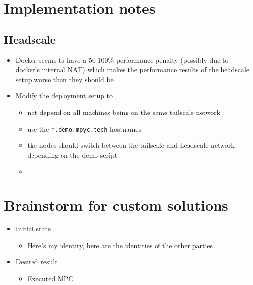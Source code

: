 \hypertarget{notes__03000-implementations.md}{}
\hypertarget{notes__03000-implementations.md__implementation-notes}{%
\chapter{Implementation
notes}\label{notes__03000-implementations.md__implementation-notes}}

\hypertarget{notes__03000-implementations.md__headscale}{%
\section{Headscale}\label{notes__03000-implementations.md__headscale}}

\begin{itemize}
\tightlist
\item
  Docker seems to have a 50-100\% performance penalty (possibly due to
  docker's internal NAT) which makes the performance results of the
  headscale setup worse than they should be
\item
  Modify the deployment setup to

  \begin{itemize}
  \tightlist
  \item
    not depend on all machines being on the same tailscale network
  \item
    use the \texttt{*.demo.mpyc.tech} hostnames
  \item
    the nodes should switch between the tailscale and headscale network
    depending on the demo script
  \item
  \end{itemize}
\end{itemize}

\hypertarget{notes__03500-brainstorm.md}{}
\hypertarget{notes__03500-brainstorm.md__brainstorm-for-custom-solutions}{%
\chapter{Brainstorm for custom
solutions}\label{notes__03500-brainstorm.md__brainstorm-for-custom-solutions}}

\begin{itemize}
\tightlist
\item
  Initial state

  \begin{itemize}
  \tightlist
  \item
    Here's my identity, here are the identities of the other parties
  \end{itemize}
\item
  Desired result

  \begin{itemize}
  \tightlist
  \item
    Executed MPC
  \end{itemize}
\end{itemize}

